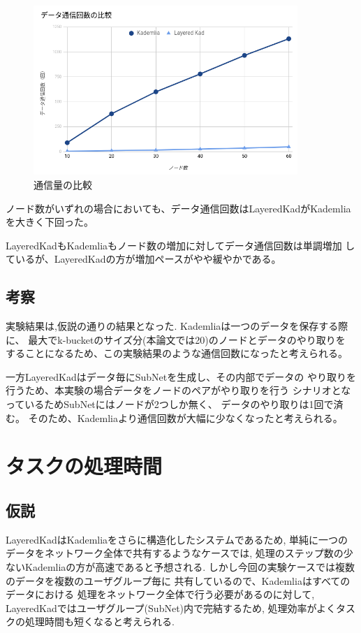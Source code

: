 \documentclass[sotsuron]{jcsie}
\begin{document}
\begin{figure}[H]	
	\centering
	\includegraphics[width=10cm]{./assets/image/traffic_graph.png}
	\caption{通信量の比較}
	\label{figure:traffic-3}
\end{figure}

ノード数がいずれの場合においても、データ通信回数はLayeredKadがKademlia
を大きく下回った。

LayeredKadもKademliaもノード数の増加に対してデータ通信回数は単調増加
しているが、LayeredKadの方が増加ペースがやや緩やかである。

\subsection{考察}
実験結果は,仮説の通りの結果となった.
Kademliaは一つのデータを保存する際に、
最大でk-bucketのサイズ分(本論文では20)のノードとデータのやり取りを
することになるため、この実験結果のような通信回数になったと考えられる。

一方LayeredKadはデータ毎にSubNetを生成し、その内部でデータの
やり取りを行うため、本実験の場合データをノードのペアがやり取りを行う
シナリオとなっているためSubNetにはノードが2つしか無く、
データのやり取りは1回で済む。
そのため、Kademliaより通信回数が大幅に少なくなったと考えられる。

\section{タスクの処理時間}
\subsection{仮説}
LayeredKadはKademliaをさらに構造化したシステムであるため,
単純に一つのデータをネットワーク全体で共有するようなケースでは,
処理のステップ数の少ないKademliaの方が高速であると予想される.
しかし今回の実験ケースでは複数のデータを複数のユーザグループ毎に
共有しているので、Kademliaはすべてのデータにおける
処理をネットワーク全体で行う必要があるのに対して,
LayeredKadではユーザグループ(SubNet)内で完結するため,
処理効率がよくタスクの処理時間も短くなると考えられる.
\end{document}
